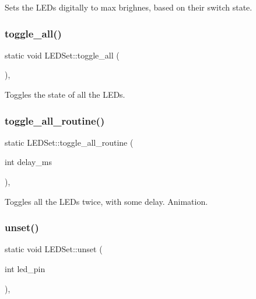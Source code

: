 Sets the L\+E\+Ds digitally to max brighnes, based on their switch state. 

\mbox{\label{classLEDSet_aec21832638aa78f34f1ff5b4133b5620}} 
\subsubsection{\texorpdfstring{toggle\+\_\+all()}{toggle\_all()}}
{\footnotesize\ttfamily static void L\+E\+D\+Set\+::toggle\+\_\+all (\begin{DoxyParamCaption}{ }\end{DoxyParamCaption})\hspace{0.3cm}{\ttfamily [inline]}, {\ttfamily [static]}}



Toggles the state of all the L\+E\+Ds. 

\mbox{\label{classLEDSet_acf2788af34b7aebec813665763256d54}} 
\subsubsection{\texorpdfstring{toggle\+\_\+all\+\_\+routine()}{toggle\_all\_routine()}}
{\footnotesize\ttfamily static L\+E\+D\+Set\+::toggle\+\_\+all\+\_\+routine (\begin{DoxyParamCaption}\item[{int}]{delay\+\_\+ms }\end{DoxyParamCaption})\hspace{0.3cm}{\ttfamily [inline]}, {\ttfamily [static]}}



Toggles all the L\+E\+Ds twice, with some delay.  Animation. 

\mbox{\label{classLEDSet_a7285285bd5359c0b7714badd34e9ee9b}} 
\subsubsection{\texorpdfstring{unset()}{unset()}\hspace{0.1cm}{\footnotesize\ttfamily [1/3]}}
{\footnotesize\ttfamily static void L\+E\+D\+Set\+::unset (\begin{DoxyParamCaption}\item[{int}]{led\+\_\+pin }\end{DoxyParamCaption})\hspace{0.3cm}{\ttfamily [inline]}, {\ttfamily [static]}}



